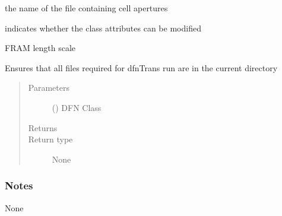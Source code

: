 \documentclass[letterpaper,10pt,english]{sphinxmanual}
\begin{document}
\begin{fulllineitems}
\begin{fulllineitems}
the name of the file containing cell apertures

\end{fulllineitems}



\begin{fulllineitems}
indicates whether the class attributes can be modified

\end{fulllineitems}



\begin{fulllineitems}
FRAM length scale

\end{fulllineitems}


\begin{fulllineitems}
\label{\detokenize{pydfnworks:pydfnworks.general.dfnworks.DFNWORKS.check_dfn_trans_run_files}}
Ensures that all files required for dfnTrans run are in the current directory
\begin{quote}\begin{description}
\item[{Parameters}] \leavevmode
{} () \textendash{} DFN Class

\item[{Returns}] \leavevmode


\item[{Return type}] \leavevmode
None

\end{description}\end{quote}
\subsubsection*{Notes}

None

\end{fulllineitems}


\end{fulllineitems}
\end{document}
